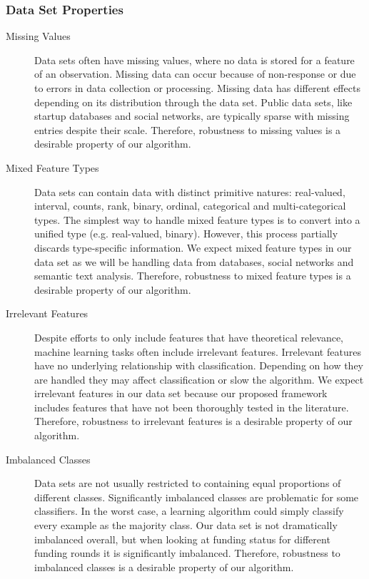 \documentclass[../thesis/thesis.tex]{subfiles}
\begin{document}
\begin{refsection}
\subsubsection{Data Set Properties}

\begin{description}

\item[Missing Values]

Data sets often have missing values, where no data is stored for a feature of an observation. Missing data can occur because of non-response or due to errors in data collection or processing. Missing data has different effects depending on its distribution through the data set. Public data sets, like startup databases and social networks, are typically sparse with missing entries despite their scale. Therefore, robustness to missing values is a desirable property of our algorithm.

\item[Mixed Feature Types]

Data sets can contain data with distinct primitive natures: real-valued, interval, counts, rank, binary, ordinal, categorical and multi-categorical types. The simplest way to handle mixed feature types is to convert into a unified type (e.g. real-valued, binary). However, this process partially discards type-specific information. We expect mixed feature types in our data set as we will be handling data from databases, social networks and semantic text analysis. Therefore, robustness to mixed feature types is a desirable property of our algorithm.

\item[Irrelevant Features]

Despite efforts to only include features that have theoretical relevance, machine learning tasks often include irrelevant features. Irrelevant features have no underlying relationship with classification. Depending on how they are handled they may affect classification or slow the algorithm. We expect irrelevant features in our data set because our proposed framework includes features that have not been thoroughly tested in the literature. Therefore, robustness to irrelevant features is a desirable property of our algorithm.

\item[Imbalanced Classes]

Data sets are not usually restricted to containing equal proportions of different classes. Significantly imbalanced classes are problematic for some classifiers. In the worst case, a learning algorithm could simply classify every example as the majority class. Our data set is not dramatically imbalanced overall, but when looking at funding status for different funding rounds it is significantly imbalanced. Therefore, robustness to imbalanced classes is a desirable property of our algorithm.


\end{description}
\end{refsection}
\end{document}
